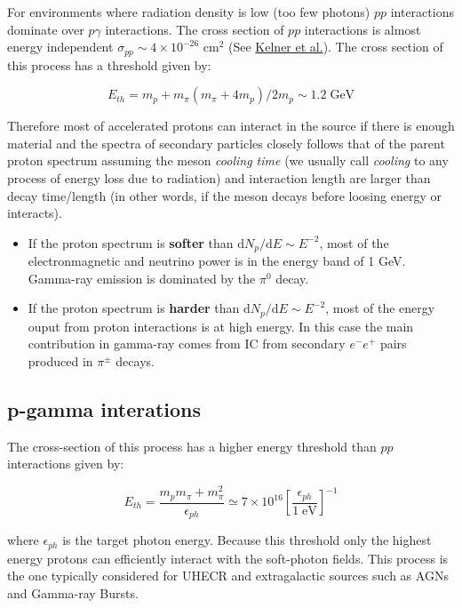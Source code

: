 \documentclass[
  letterpaper,
  DIV=11,
  numbers=noendperiod]{scrreprt}
\begin{document}
For environments where radiation density is low (too few photons) \(pp\)
interactions dominate over \(p\gamma\) interactions. The cross section
of \(pp\) interactions is almost energy independent
\(\sigma_{pp} \sim 4 \times 10^{-26}\) cm\(^2\) (See
\href{\%22http://arxiv.org/abs/astro-ph/0606058\%22}{Kelner et al.}).
The cross section of this process has a threshold given by:

\[E_{th} = m_p + m_\pi(m_\pi + 4m_p)/2m_p \sim 1.2 \mathrm{\; GeV}\]

Therefore most of accelerated protons can interact in the source if
there is enough material and the spectra of secondary particles closely
follows that of the parent proton spectrum assuming the meson
\emph{cooling time} (we usually call \emph{cooling} to any process of
energy loss due to radiation) and interaction length are larger than
decay time/length (in other words, if the meson decays before loosing
energy or interacts).

\begin{itemize}
\item
  If the proton spectrum is \textbf{softer} than
  \(\mathrm{ d}N_p/\mathrm{ d}E \sim E^{-2}\), most of the
  electronmagnetic and neutrino power is in the energy band of 1 GeV.
  Gamma-ray emission is dominated by the \(\pi^0\) decay.
\item
  If the proton spectrum is \textbf{harder} than
  \(\mathrm{ d}N_p/\mathrm{ d}E \sim E^{-2}\), most of the energy ouput
  from proton interactions is at high energy. In this case the main
  contribution in gamma-ray comes from IC from secondary \(e^-e^+\)
  pairs produced in \(\pi^{\pm}\) decays.
\end{itemize}

\subsection{p-gamma interations}\label{p-gamma-interations}

The cross-section of this process has a higher energy threshold than
\(pp\) interactions given by:

\[E_{th} = \frac{m_p m_{\pi} + m_{\pi}^2}{\epsilon_{ph}} \simeq 7 \times 10^{16} \left[\frac{\epsilon_{ph}}{1\mathrm{\; eV}}\right]^{-1}\]

where \(\epsilon_{ph}\) is the target photon energy. Because this
threshold only the highest energy protons can efficiently interact with
the soft-photon fields. This process is the one typically considered for
UHECR and extragalactic sources such as AGNs and Gamma-ray Bursts.
\end{document}
